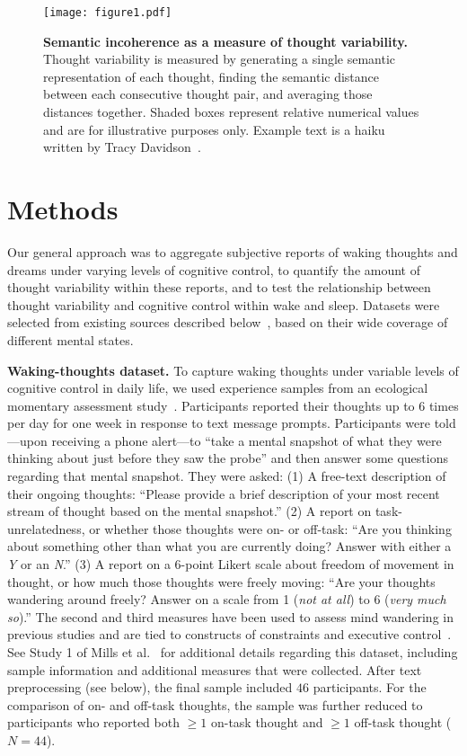 \documentclass[10pt,a4paper,twocolumn]{article}
\begin{document}

\begin{figure*}[t]
    \centering
    \texttt{[image: figure1.pdf]}
    \caption{\textbf{Semantic incoherence as a measure of thought variability.} Thought variability is measured by generating a single semantic representation of each thought, finding the semantic distance between each consecutive thought pair, and averaging those distances together. Shaded boxes represent relative numerical values and are for illustrative purposes only. Example text is a haiku written by Tracy Davidson~\cite{tracy2021}.}
    \label{fig:methods}
\end{figure*}

\section*{Methods}

Our general approach was to aggregate subjective reports of waking thoughts and dreams under varying levels of cognitive control, to quantify the amount of thought variability within these reports, and to test the relationship between thought variability and cognitive control within wake and sleep. Datasets were selected from existing sources described below~\cite{mills2021,schredl2022}, based on their wide coverage of different mental states.

\textbf{Waking-thoughts dataset.}
To capture waking thoughts under variable levels of cognitive control in daily life, we used experience samples from an ecological momentary assessment study~\cite{mills2021}. Participants reported their thoughts up to 6 times per day for one week in response to text message prompts. Participants were told---upon receiving a phone alert---to ``take a mental snapshot of what they were thinking about just before they saw the probe'' and then answer some questions regarding that mental snapshot. They were asked: (1) A free-text description of their ongoing thoughts: ``Please provide a brief description of your most recent stream of thought based on the mental snapshot.'' (2) A report on task-unrelatedness, or whether those thoughts were on- or off-task: ``Are you thinking about something other than what you are currently doing? Answer with either a \textit{Y} or an \textit{N}.'' (3) A report on a 6-point Likert scale about freedom of movement in thought, or how much those thoughts were freely moving: ``Are your thoughts wandering around freely? Answer on a scale from 1 (\textit{not at all}) to 6 (\textit{very much so}).'' The second and third measures have been used to assess mind wandering in previous studies and are tied to constructs of constraints and executive control~\cite{mills2018a}. See Study 1 of Mills et al.~\cite{mills2021} for additional details regarding this dataset, including sample information and additional measures that were collected. After text preprocessing (see below), the final sample included $46$ participants. For the comparison of on- and off-task thoughts, the sample was further reduced to participants who reported both $\ge 1$ on-task thought and $\ge 1$ off-task thought ($\mathit{N}=44$).
\end{document}
